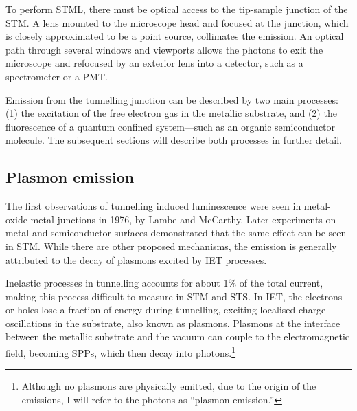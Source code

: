 To perform \ac{STML}, there must be optical access to the tip-sample junction of the \ac{STM}. A lens mounted to the microscope head and focused at the junction, which is closely approximated to be a point source, collimates the emission. An optical path through several windows and viewports allows the photons to exit the microscope and refocused by an exterior lens into a detector, such as a spectrometer or a \ac{PMT}. 


Emission from the tunnelling junction can be described by two main processes: (1) the excitation of the free electron gas in the metallic substrate, and (2) the fluorescence of a quantum confined system---such as an organic semiconductor molecule. The subsequent sections will describe both processes in further detail. 


\subsection{Plasmon emission}

The first observations of tunnelling induced luminescence were seen in metal-oxide-metal junctions in 1976, by Lambe and McCarthy. Later experiments on metal and semiconductor surfaces demonstrated that the same effect can be seen in \ac{STM}. While there are other proposed mechanisms, the emission is generally attributed to the decay of plasmons excited by \acf{IET} processes.

Inelastic processes in tunnelling accounts for about 1\% of the total current, making this process difficult to measure in \ac{STM} and \ac{STS}. In \ac{IET}, the electrons or holes lose a fraction of energy during tunnelling, exciting localised charge oscillations in the substrate, also known as plasmons. Plasmons at the interface between the metallic substrate and the vacuum can couple to the electromagnetic field, becoming \acp{SPP}, which then decay into photons.\footnote{Although no plasmons are physically emitted, due to the origin of the emissions, I will refer to the photons as ``plasmon emission.''} 

